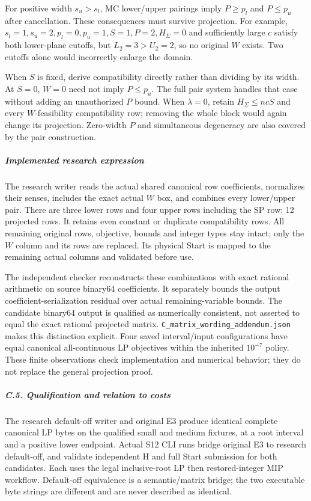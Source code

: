 \documentclass[
  american,
  11pt,
]{article}
\begin{document}
For positive width \(s_u>s_l\), MC lower/upper pairings imply
\(P\ge p_l\) and \(P\le p_u\) after cancellation. These consequences
must survive projection. For example,
\(s_l=1,s_u=2,p_l=0,p_u=1,S=1,P=2,H_\Sigma=0\) and sufficiently large
\(c\) satisfy both lower-plane cutoffs, but \(L_2=3>U_2=2\), so no
original \(W\) exists. Two cutoffs alone would incorrectly enlarge the
domain.

When \(S\) is fixed, derive compatibility directly rather than dividing
by its width. At \(S=0\), \(W=0\) need not imply \(P\le p_u\). The full
pair system handles that case without adding an unauthorized \(P\)
bound. When \(\lambda=0\), retain \(H_\Sigma\le ncS\) and every
\(W\)-feasibility compatibility row; removing the whole block would
again change its projection. Zero-width \(P\) and simultaneous
degeneracy are also covered by the pair construction.

\subparagraph{Implemented research
expression}\label{implemented-research-expression}

The research writer reads the actual shared canonical row coefficients,
normalizes their senses, includes the exact actual \(W\) box, and
combines every lower/upper pair. There are three lower rows and four
upper rows including the SP row: 12 projected rows. It retains even
constant or duplicate compatibility rows. All remaining original rows,
objective, bounds and integer types stay intact; only the \(W\) column
and its rows are replaced. Its physical Start is mapped to the remaining
actual columns and validated before use.

The independent checker reconstructs these combinations with exact
rational arithmetic on source binary64 coefficients. It separately
bounds the output coefficient-serialization residual over actual
remaining-variable bounds. The candidate binary64 output is qualified as
numerically consistent, not asserted to equal the exact rational
projected matrix.
\texttt{C\_\allowbreak{}matrix\_\allowbreak{}wording\_\allowbreak{}addendum.json} makes this
distinction explicit. Four saved interval/input configurations have
equal canonical all-continuous LP objectives within the inherited
\(10^{-7}\) policy. These finite observations check implementation and
numerical behavior; they do not replace the general projection proof.

\subparagraph{C.5. Qualification and relation to
costs}\label{c.5.-qualification-and-relation-to-costs}

The research default-off writer and original E3 produce identical
complete canonical LP bytes on the qualified small and medium fixtures,
at a root interval and a positive lower endpoint. Actual S12 CLI runs
bridge original E3 to research default-off, and validate independent H
and full Start submission for both candidates. Each uses the legal
inclusive-root LP then restored-integer MIP workflow. Default-off
equivalence is a semantic/matrix bridge; the two executable byte strings
are different and are never described as identical.
\end{document}
